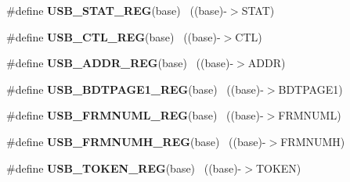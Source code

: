 \begin{DoxyCompactItemize}
\item 
\hypertarget{group___u_s_b___register___accessor___macros_gaeab7fa3c051021f1fc0efcb46483e7b4}{}\#define {\bfseries U\+S\+B\+\_\+\+S\+T\+A\+T\+\_\+\+R\+E\+G}(base)                                          ~((base)-\/$>$S\+T\+A\+T)\label{group___u_s_b___register___accessor___macros_gaeab7fa3c051021f1fc0efcb46483e7b4}

\item 
\hypertarget{group___u_s_b___register___accessor___macros_gad64167a6ab05b5ae9dba249da9ad7af7}{}\#define {\bfseries U\+S\+B\+\_\+\+C\+T\+L\+\_\+\+R\+E\+G}(base)                                            ~((base)-\/$>$C\+T\+L)\label{group___u_s_b___register___accessor___macros_gad64167a6ab05b5ae9dba249da9ad7af7}

\item 
\hypertarget{group___u_s_b___register___accessor___macros_ga03f0a41161dca06c094577e93612fcc9}{}\#define {\bfseries U\+S\+B\+\_\+\+A\+D\+D\+R\+\_\+\+R\+E\+G}(base)                                          ~((base)-\/$>$A\+D\+D\+R)\label{group___u_s_b___register___accessor___macros_ga03f0a41161dca06c094577e93612fcc9}

\item 
\hypertarget{group___u_s_b___register___accessor___macros_gaee966956afc1831775ca4985a36bef1c}{}\#define {\bfseries U\+S\+B\+\_\+\+B\+D\+T\+P\+A\+G\+E1\+\_\+\+R\+E\+G}(base)                                  ~((base)-\/$>$B\+D\+T\+P\+A\+G\+E1)\label{group___u_s_b___register___accessor___macros_gaee966956afc1831775ca4985a36bef1c}

\item 
\hypertarget{group___u_s_b___register___accessor___macros_ga93fd74f20933fb2aa15f86de9b46436a}{}\#define {\bfseries U\+S\+B\+\_\+\+F\+R\+M\+N\+U\+M\+L\+\_\+\+R\+E\+G}(base)                                    ~((base)-\/$>$F\+R\+M\+N\+U\+M\+L)\label{group___u_s_b___register___accessor___macros_ga93fd74f20933fb2aa15f86de9b46436a}

\item 
\hypertarget{group___u_s_b___register___accessor___macros_ga8a4e8ec678086774fac29ef632712987}{}\#define {\bfseries U\+S\+B\+\_\+\+F\+R\+M\+N\+U\+M\+H\+\_\+\+R\+E\+G}(base)                                    ~((base)-\/$>$F\+R\+M\+N\+U\+M\+H)\label{group___u_s_b___register___accessor___macros_ga8a4e8ec678086774fac29ef632712987}

\item 
\hypertarget{group___u_s_b___register___accessor___macros_ga58de1b6987e899f3460e032f9f28bf99}{}\#define {\bfseries U\+S\+B\+\_\+\+T\+O\+K\+E\+N\+\_\+\+R\+E\+G}(base)                                        ~((base)-\/$>$T\+O\+K\+E\+N)\label{group___u_s_b___register___accessor___macros_ga58de1b6987e899f3460e032f9f28bf99}


\end{DoxyCompactItemize}
